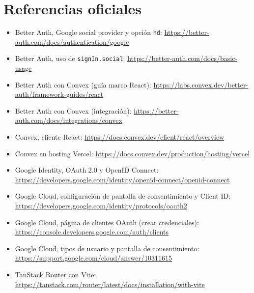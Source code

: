 \documentclass[11pt,a4paper]{article}
\begin{document}
\section{Referencias oficiales}

\begin{itemize}
  \item Better Auth, Google social provider y opción \texttt{hd}:
    \url{https://better-auth.com/docs/authentication/google}
  \item Better Auth, uso de \texttt{signIn.social}:
    \url{https://better-auth.com/docs/basic-usage}
  \item Better Auth con Convex (guía marco React):
    \url{https://labs.convex.dev/better-auth/framework-guides/react}
  \item Better Auth con Convex (integración):
    \url{https://better-auth.com/docs/integrations/convex}
  \item Convex, cliente React:
    \url{https://docs.convex.dev/client/react/overview}
  \item Convex en hosting Vercel:
    \url{https://docs.convex.dev/production/hosting/vercel}
  \item Google Identity, OAuth 2.0 y OpenID Connect:
    \url{https://developers.google.com/identity/openid-connect/openid-connect}
  \item Google Cloud, configuración de pantalla de consentimiento y Client ID:
    \url{https://developers.google.com/identity/protocols/oauth2}
  \item Google Cloud, página de clientes OAuth (crear credenciales):
    \url{https://console.developers.google.com/auth/clients}
  \item Google Cloud, tipos de usuario y pantalla de consentimiento:
    \url{https://support.google.com/cloud/answer/10311615}
  \item TanStack Router con Vite:
    \url{https://tanstack.com/router/latest/docs/installation/with-vite}
\end{itemize}
\end{document}
